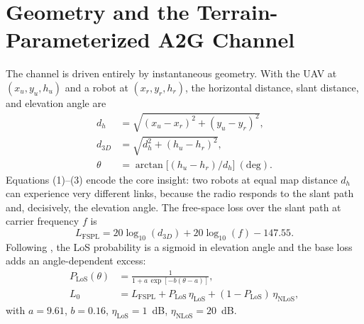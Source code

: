 \documentclass[10pt, conference]{IEEEtran}
\begin{document}
\section{Geometry and the Terrain-Parameterized A2G Channel}
\label{sec:channel}
The channel is driven entirely by instantaneous geometry. With the UAV at
$(x_u,y_u,h_u)$ and a robot at $(x_r,y_r,h_r)$, the horizontal distance, slant
distance, and elevation angle are
\begin{align}
d_h &= \sqrt{(x_u-x_r)^2 + (y_u-y_r)^2},\\
d_{3D} &= \sqrt{d_h^2 + (h_u-h_r)^2},\\
\theta &= \arctan\!\big[(h_u-h_r)/d_h\big]\ (\mathrm{deg}).
\end{align}
Equations (1)--(3) encode the core insight: two robots at equal map distance $d_h$
can experience very different links, because the radio responds to the slant path
and, decisively, the elevation angle. The free-space loss over the slant path at
carrier frequency $f$ is
\begin{equation}
L_{\mathrm{FSPL}} = 20\log_{10}(d_{3D}) + 20\log_{10}(f) - 147.55.
\end{equation}
Following \cite{alhourani2014optimal}, the LoS probability is a sigmoid in
elevation angle and the base loss adds an angle-dependent excess:
\begin{align}
P_{\mathrm{LoS}}(\theta) &= \frac{1}{1 + a\,\exp[-b(\theta-a)]},\\
L_0 &= L_{\mathrm{FSPL}} + P_{\mathrm{LoS}}\,\eta_{\mathrm{LoS}}
       + (1-P_{\mathrm{LoS}})\,\eta_{\mathrm{NLoS}},
\end{align}
with $a=9.61$, $b=0.16$, $\eta_{\mathrm{LoS}}=1$~dB, $\eta_{\mathrm{NLoS}}=20$~dB.
\end{document}
